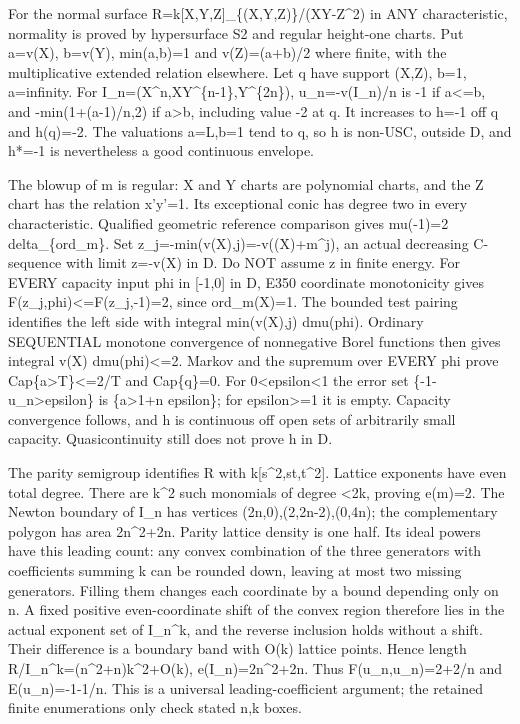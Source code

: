 \documentclass[11pt]{article}
\begin{document}
For the normal surface R=k[X,Y,Z]\_\{(X,Y,Z)\}/(XY-Z\textasciicircum{}2) in ANY characteristic, normality is proved by hypersurface S2 and regular height-one charts. Put a=v(X), b=v(Y), min(a,b)=1 and v(Z)=(a+b)/2 where finite, with the multiplicative extended relation elsewhere. Let q have support (X,Z), b=1, a=infinity. For I\_n=(X\textasciicircum{}n,XY\textasciicircum{}\{n-1\},Y\textasciicircum{}\{2n\}), u\_n=-v(I\_n)/n is -1 if a<=b, and -min(1+(a-1)/n,2) if a>b, including value -2 at q. It increases to h=-1 off q and h(q)=-2. The valuations a=L,b=1 tend to q, so h is non-USC, outside D, and h*=-1 is nevertheless a good continuous envelope.

The blowup of m is regular: X and Y charts are polynomial charts, and the Z chart has the relation x'y'=1. Its exceptional conic has degree two in every characteristic. Qualified geometric reference comparison gives mu(-1)=2 delta\_\{ord\_m\}. Set z\_j=-min(v(X),j)=-v((X)+m\textasciicircum{}j), an actual decreasing C-sequence with limit z=-v(X) in D. Do NOT assume z in finite energy. For EVERY capacity input phi in [-1,0] in D, E350 coordinate monotonicity gives
 F(z\_j,phi)<=F(z\_j,-1)=2,
since ord\_m(X)=1. The bounded test pairing identifies the left side with integral min(v(X),j) dmu(phi). Ordinary SEQUENTIAL monotone convergence of nonnegative Borel functions then gives integral v(X) dmu(phi)<=2. Markov and the supremum over EVERY phi prove Cap\{a>T\}<=2/T and Cap\{q\}=0. For 0<epsilon<1 the error set \{-1-u\_n>epsilon\} is \{a>1+n epsilon\}; for epsilon>=1 it is empty. Capacity convergence follows, and h is continuous off open sets of arbitrarily small capacity. Quasicontinuity still does not prove h in D.

The parity semigroup identifies R with k[s\textasciicircum{}2,st,t\textasciicircum{}2]. Lattice exponents have even total degree. There are k\textasciicircum{}2 such monomials of degree <2k, proving e(m)=2. The Newton boundary of I\_n has vertices (2n,0),(2,2n-2),(0,4n); the complementary polygon has area 2n\textasciicircum{}2+2n. Parity lattice density is one half. Its ideal powers have this leading count: any convex combination of the three generators with coefficients summing k can be rounded down, leaving at most two missing generators. Filling them changes each coordinate by a bound depending only on n. A fixed positive even-coordinate shift of the convex region therefore lies in the actual exponent set of I\_n\textasciicircum{}k, and the reverse inclusion holds without a shift. Their difference is a boundary band with O(k) lattice points. Hence length R/I\_n\textasciicircum{}k=(n\textasciicircum{}2+n)k\textasciicircum{}2+O(k), e(I\_n)=2n\textasciicircum{}2+2n. Thus F(u\_n,u\_n)=2+2/n and E(u\_n)=-1-1/n. This is a universal leading-coefficient argument; the retained finite enumerations only check stated n,k boxes.
\end{document}
